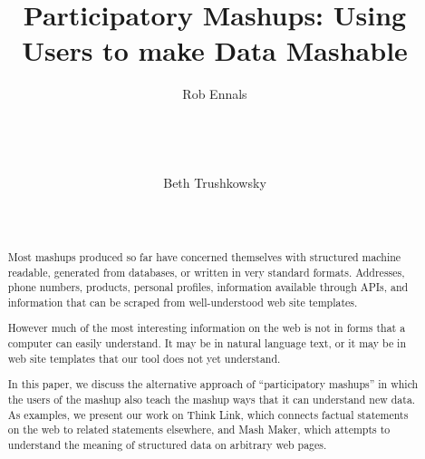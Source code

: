 \documentclass{chi2009}
\begin{document}
\setlength{\paperheight}{11in}
\setlength{\paperwidth}{8.5in}
\setlength{\pdfpageheight}{\paperheight}
\setlength{\pdfpagewidth}{\paperwidth}
%

\title{Participatory Mashups: Using Users to make Data Mashable}



\author{
\alignauthor Rob Ennals\\
       \\
       \\
       \\
       \\
\alignauthor Beth Trushkowsky\\
       \\
       \\
}
\sloppy 

\maketitle

\begin{abstract}
Most mashups produced so far have concerned themselves with structured machine readable, generated from databases, or written in very standard formats. Addresses, phone numbers, products, personal profiles, information available through APIs, and information that can be scraped from well-understood web site templates.

However much of the most interesting information on the web is not in forms that a computer can easily understand. It may be in natural language text, or it may be in web site templates that our tool does not yet understand.

In this paper, we discuss the alternative approach of ``participatory mashups'' in which the users of the mashup also teach the mashup ways that it can understand new data. As examples, we present our work on Think Link, which connects factual statements on the web to related statements elsewhere, and Mash Maker, which attempts to understand the meaning of structured data on arbitrary web pages.
\end{abstract}
\end{document}

